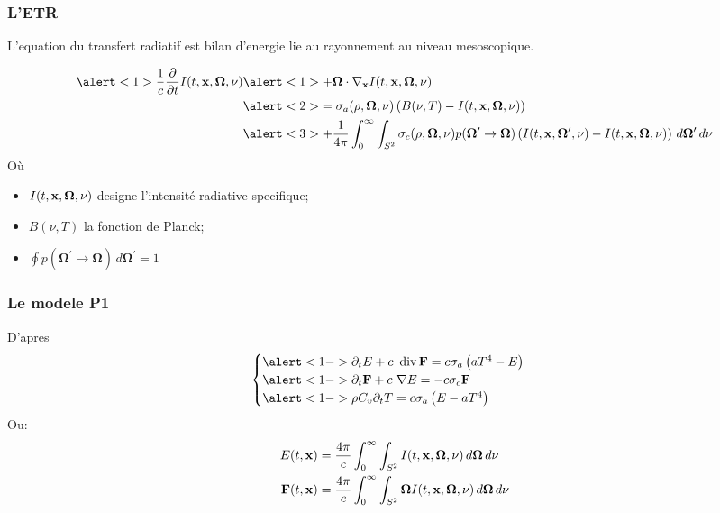 \begin{frame}
  \frametitle{L'ETR}
  L'equation du transfert radiatif est bilan d'energie lie au rayonnement au niveau mesoscopique. 

  \begingroup
  \scriptsize
  \begin{gather*}
      \begin{aligned}
        \alert<1>{\frac{1}{c} \frac{\partial}{\partial t}I(t,\bvec{x},\bm{\Omega},\nu)} &\alert<1>{+\bm{\Omega}\cdot\nabla_{\bvec{x}} I(t,\bvec{x},\bm{\Omega},\nu)} \\
      &\alert<2>{= \sigma_a(\rho,\bm{\Omega},\nu)\left(B(\nu,T)-I(t,\bvec{x},\bm{\Omega},\nu)\right)} \\
      &\alert<3>{+ \frac{1}{4\pi} \int_{0}^{\infty} \int_{S^2}\sigma_c(\rho,\bm{\Omega},\nu)p(\bm{\Omega}^\prime\rightarrow\bm{\Omega})\left(I(t,\bvec{x},\bm{\Omega}^\prime,\nu)-I(t,\bvec{x},\bm{\Omega},\nu)\right) \, d\bm{\Omega}^\prime \, d\nu}
      \end{aligned}
  \end{gather*}
  \endgroup
Où 
\begin{itemize}
  \item $I(t,\mathbf{x},\bm{\Omega},\nu)$ designe l'intensité radiative specifique;
  \item $B(\nu,T)$ la fonction de Planck;
  \item $\oint p(\bm{\Omega}^\prime\rightarrow\bm{\Omega})\, d\bm{\Omega}^\prime=1$
\end{itemize}

\end{frame}

\begin{frame}
  \frametitle{Le modele P1}
  D'apres \parencite{Reference2}
  \begingroup
  \large
  \begin{equation*}
      \begin{cases}
        \alert<1->{\partial_tE + c \ \operatorname {div} \bvec F = c\sigma_a\left(aT^4-E\right)}\\
        \alert<1->{\partial_t\bvec{F} + c \ \nabla E = -c\sigma_c \bvec{F}} \\
        \alert<1->{\rho C_v \partial_t T = c \sigma_a \left(E-aT^4\right)}
      \end{cases}
  \end{equation*}
  \endgroup
Ou:   %
\begin{align*}
  E(t,\mathbf{x}) &= \frac{4\pi}{c} \int_{0}^{\infty} \int_{S^2} I(t,\mathbf{x},\bm{\Omega},\nu) \, d\bm{\Omega} \, d\nu \\
  \mathbf{F}(t,\mathbf{x}) &= \frac{4\pi}{c} \int_{0}^{\infty} \int_{S^2} \bm{\Omega}I(t,\mathbf{x},\bm{\Omega},\nu) \, d\bm{\Omega} \, d\nu 
\end{align*}

\end{frame}

